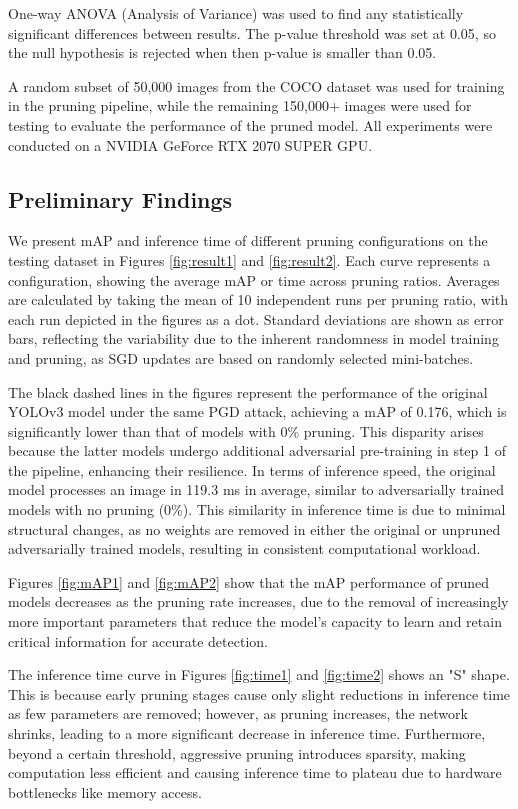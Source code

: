 \documentclass[10pt]{cai}
\begin{document}
One-way ANOVA (Analysis of Variance) was used to find any statistically significant differences between results. The p-value threshold was set at 0.05, so the null hypothesis is rejected when then p-value is smaller than 0.05.

A random subset of 50,000 images from the COCO dataset was used for training in the pruning pipeline, while the remaining 150,000+ images were used for testing to evaluate the performance of the pruned model. All experiments were conducted on a NVIDIA GeForce RTX 2070 SUPER GPU.


\subsection{Preliminary Findings}
We present mAP and inference time of different pruning configurations on the testing dataset in Figures \ref{fig:result1} and \ref{fig:result2}. Each curve represents a configuration, showing the average mAP or time across pruning ratios. Averages are calculated by taking the mean of 10 independent runs per pruning ratio, with each run depicted in the figures as a dot. Standard deviations are shown as error bars, reflecting the variability due to the inherent randomness in model training and pruning, as SGD updates are based on randomly selected mini-batches.

The black dashed lines in the figures represent the performance of the original YOLOv3 model under the same PGD attack, achieving a mAP of 0.176, which is significantly lower than that of models with 0\% pruning. This disparity arises because the latter models undergo additional adversarial pre-training in step 1 of the pipeline, enhancing their resilience. In terms of inference speed, the original model processes an image in 119.3 ms in average, similar to adversarially trained models with no pruning (0\%). This similarity in inference time is due to minimal structural changes, as no weights are removed in either the original or unpruned adversarially trained models, resulting in consistent computational workload.

Figures \ref{fig:mAP1} and \ref{fig:mAP2} show that the mAP performance of pruned models decreases as the pruning rate increases, due to the removal of increasingly more important parameters that reduce the model's capacity to learn and retain critical information for accurate detection. 

The inference time curve in Figures \ref{fig:time1} and \ref{fig:time2} shows an "S" shape. This is because early pruning stages cause only slight reductions in inference time as few parameters are removed; however, as pruning increases, the network shrinks, leading to a more significant decrease in inference time. Furthermore, beyond a certain threshold, aggressive pruning introduces sparsity, making computation less efficient and causing inference time to plateau due to hardware bottlenecks like memory access.
\end{document}
